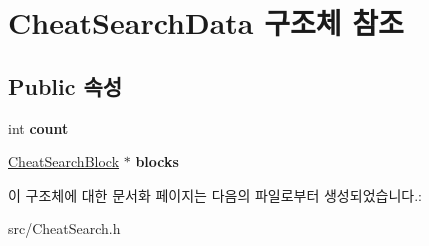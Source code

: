 \hypertarget{struct_cheat_search_data}{}\section{Cheat\+Search\+Data 구조체 참조}
\label{struct_cheat_search_data}
\subsection*{Public 속성}
\begin{DoxyCompactItemize}
\item 
\mbox{\label{struct_cheat_search_data_a4c4d3092ddaff068d820c28067b15774}} 
int {\bfseries count}
\item 
\mbox{\label{struct_cheat_search_data_ae0235bdc2000cc25b8c072442ce33c2c}} 
\mbox{\hyperlink{struct_cheat_search_block}{Cheat\+Search\+Block}} $\ast$ {\bfseries blocks}
\end{DoxyCompactItemize}


이 구조체에 대한 문서화 페이지는 다음의 파일로부터 생성되었습니다.\+:\begin{DoxyCompactItemize}
\item 
src/Cheat\+Search.\+h\end{DoxyCompactItemize}
